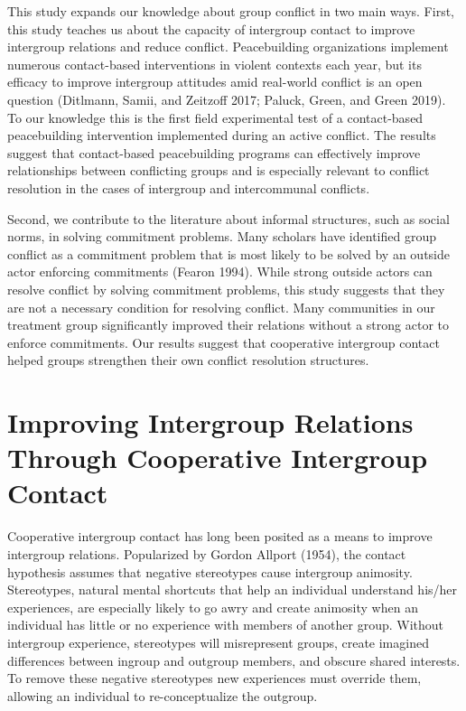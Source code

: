 \documentclass[11pt]{article}
\begin{document}
This study expands our knowledge about group conflict in two main ways.
First, this study teaches us about the capacity of intergroup contact to
improve intergroup relations and reduce conflict. Peacebuilding
organizations implement numerous contact-based interventions in violent
contexts each year, but its efficacy to improve intergroup attitudes
amid real-world conflict is an open question (Ditlmann, Samii, and
Zeitzoff 2017; Paluck, Green, and Green 2019). To our knowledge this is
the first field experimental test of a contact-based peacebuilding
intervention implemented during an active conflict. The results suggest
that contact-based peacebuilding programs can effectively improve
relationships between conflicting groups and is especially relevant to
conflict resolution in the cases of intergroup and intercommunal
conflicts.

Second, we contribute to the literature about informal structures, such
as social norms, in solving commitment problems. Many scholars have
identified group conflict as a commitment problem that is most likely to
be solved by an outside actor enforcing commitments (Fearon 1994). While
strong outside actors can resolve conflict by solving commitment
problems, this study suggests that they are not a necessary condition
for resolving conflict. Many communities in our treatment group
significantly improved their relations without a strong actor to enforce
commitments. Our results suggest that cooperative intergroup contact
helped groups strengthen their own conflict resolution structures.

\hypertarget{improving-intergroup-relations-through-cooperative-intergroup-contact}{%
\section{Improving Intergroup Relations Through Cooperative Intergroup
Contact}\label{improving-intergroup-relations-through-cooperative-intergroup-contact}}

Cooperative intergroup contact has long been posited as a means to
improve intergroup relations. Popularized by Gordon Allport (1954), the
contact hypothesis assumes that negative stereotypes cause intergroup
animosity. Stereotypes, natural mental shortcuts that help an individual
understand his/her experiences, are especially likely to go awry and
create animosity when an individual has little or no experience with
members of another group. Without intergroup experience, stereotypes
will misrepresent groups, create imagined differences between ingroup
and outgroup members, and obscure shared interests. To remove these
negative stereotypes new experiences must override them, allowing an
individual to re-conceptualize the outgroup.
\end{document}
